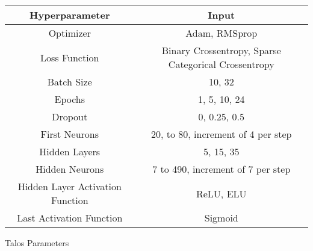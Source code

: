 \begin{tabular}{|c|c|}
    \hline
    Hyperparameter & Input\\
    \hline
    \hline
    Optimizer & Adam, RMSprop  \\
    \hline
    Loss Function & Binary Crossentropy, Sparse Categorical Crossentropy  \\
    \hline
    Batch Size & 10, 32\\
    \hline
    Epochs & 1, 5, 10, 24\\
    \hline
    Dropout & 0, 0.25, 0.5 \\
    \hline
    First Neurons & 20, to 80, increment of 4 per step  \\
    \hline
    Hidden Layers & 5, 15, 35  \\
    \hline
    Hidden Neurons & 7 to 490, increment of 7 per step  \\
    \hline
    Hidden Layer Activation Function & ReLU, ELU\\
    \hline
    Last Activation Function & Sigmoid\\
    \hline
\end{tabular}
\caption{Talos Parameters}
\label{tab:Final Talos Parameters}